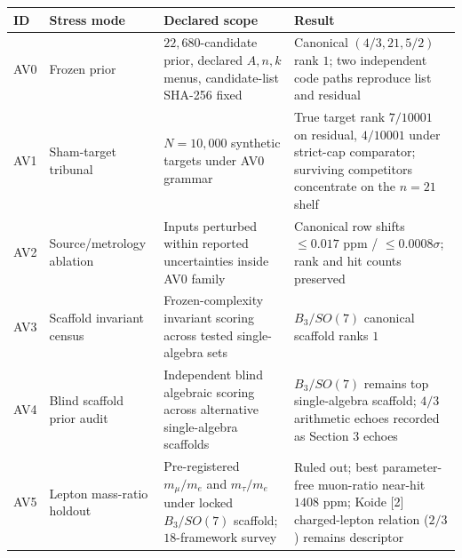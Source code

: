 \documentclass[
  11pt,
  letterpaper,
  twocolumn,
]{article}
\begin{document}
\begin{table}[!htb]
\centering\small
\begin{tabular}{@{}
  >{\raggedright\arraybackslash}p{}
  >{\raggedright\arraybackslash}p{}
  >{\raggedright\arraybackslash}p{}
  >{\raggedright\arraybackslash}p{}@{}}
\toprule
\begin{minipage}[b]{\linewidth}\raggedright
ID
\end{minipage} & \begin{minipage}[b]{\linewidth}\raggedright
Stress mode
\end{minipage} & \begin{minipage}[b]{\linewidth}\raggedright
Declared scope
\end{minipage} & \begin{minipage}[b]{\linewidth}\raggedright
Result
\end{minipage} \\
\midrule
AV0 & Frozen prior & \(22{,}680\)-candidate prior, declared \(A,n,k\)
menus, candidate-list SHA-256 fixed & Canonical \((4/3,21,5/2)\) rank
\(1\); two independent code paths reproduce list and residual \\
AV1 & Sham-target tribunal & \(N\!=\!10{,}000\) synthetic targets under
AV0 grammar & True target rank \(7/10001\) on residual, \(4/10001\)
under strict-cap comparator; surviving competitors concentrate on the
\(n\!=\!21\) shelf \\
AV2 & Source/metrology ablation & Inputs perturbed within reported
uncertainties inside AV0 family & Canonical row shifts \(\le 0.017\) ppm
/ \(\le 0.0008\sigma\); rank and hit counts preserved \\
AV3 & Scaffold invariant census & Frozen-complexity invariant scoring
across tested single-algebra sets & \(B_3/SO(7)\) canonical scaffold
ranks \(1\) \\
AV4 & Blind scaffold prior audit & Independent blind algebraic scoring
across alternative single-algebra scaffolds & \(B_3/SO(7)\) remains top
single-algebra scaffold; \(4/3\) arithmetic echoes recorded as Section 3
echoes \\
AV5 & Lepton mass-ratio holdout & Pre-registered \(m_\mu/m_e\) and
\(m_\tau/m_e\) under locked \(B_3/SO(7)\) scaffold; \(18\)-framework
survey & Ruled out; best parameter-free muon-ratio near-hit \(1408\)
ppm; Koide {[}2{]} charged-lepton relation (\(2/3\)) remains descriptor

\end{tabular}
\end{table}
\end{document}
